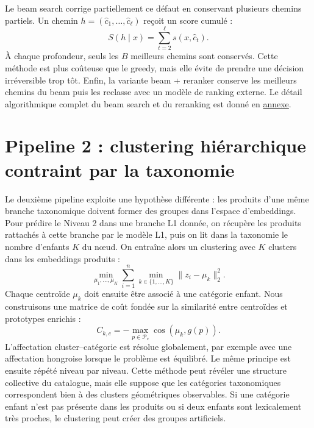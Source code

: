 \documentclass[12pt,a4paper]{report}
\begin{document}
Le beam search corrige partiellement ce défaut en conservant plusieurs chemins partiels. Un chemin $h=(\hat{c}_1,\ldots,\hat{c}_\ell)$ reçoit un score cumulé :
\begin{equation}
    S(h\mid x)=\sum_{t=2}^{\ell}s(x,\hat{c}_t).
\end{equation}
À chaque profondeur, seuls les $B$ meilleurs chemins sont conservés. Cette méthode est plus coûteuse que le greedy, mais elle évite de prendre une décision irréversible trop tôt. Enfin, la variante beam + reranker conserve les meilleurs chemins du beam puis les reclasse avec un modèle de ranking externe. Le détail algorithmique complet du beam search et du reranking est donné en \hyperref[sec:beam-reranker-annex]{annexe}.

\section{Pipeline 2 : clustering hiérarchique contraint par la taxonomie}
\label{sec:l2-l7-pipeline2-clustering-main}

Le deuxième pipeline exploite une hypothèse différente : les produits d'une même branche taxonomique doivent former des groupes dans l'espace d'embeddings. Pour prédire le Niveau 2 dans une branche L1 donnée, on récupère les produits rattachés à cette branche par le modèle L1, puis on lit dans la taxonomie le nombre d'enfants $K$ du nœud. On entraîne alors un clustering avec $K$ clusters dans les embeddings produits :
\begin{equation}
    \min_{\mu_1,\ldots,\mu_K}
    \sum_{i=1}^{n}
    \min_{k\in\{1,\ldots,K\}}
    \|z_i-\mu_k\|_2^2.
\end{equation}
Chaque centroïde $\mu_k$ doit ensuite être associé à une catégorie enfant. Nous construisons une matrice de coût fondée sur la similarité entre centroïdes et prototypes enrichis :
\begin{equation}
    C_{k,c}
    =
    -\max_{p\in\mathcal{P}_c}\cos(\mu_k,g(p)).
\end{equation}
L'affectation cluster--catégorie est résolue globalement, par exemple avec une affectation hongroise lorsque le problème est équilibré. Le même principe est ensuite répété niveau par niveau. Cette méthode peut révéler une structure collective du catalogue, mais elle suppose que les catégories taxonomiques correspondent bien à des clusters géométriques observables. Si une catégorie enfant n'est pas présente dans les produits ou si deux enfants sont lexicalement très proches, le clustering peut créer des groupes artificiels.
\end{document}
